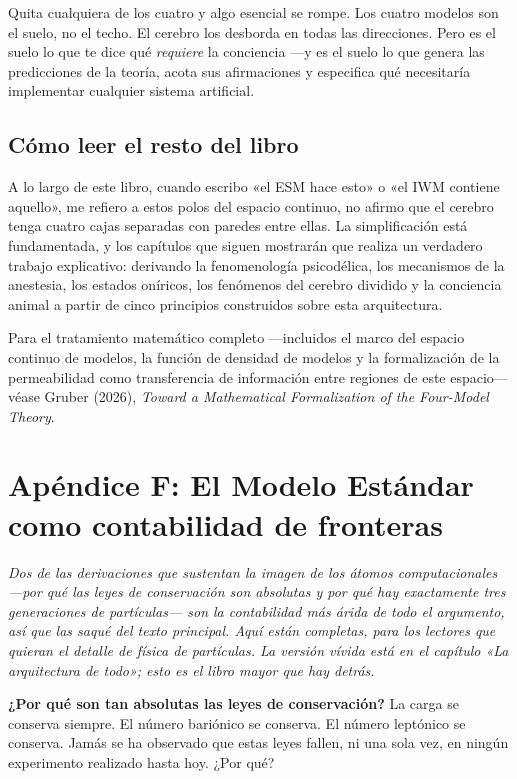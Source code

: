 \documentclass[11pt, twoside, openright]{book}
\begin{document}
Quita cualquiera de los cuatro y algo esencial se rompe. Los cuatro modelos son el suelo, no el techo. El cerebro los desborda en todas las direcciones. Pero es el suelo lo que te dice qué \textit{requiere} la conciencia ---y es el suelo lo que genera las predicciones de la teoría, acota sus afirmaciones y especifica qué necesitaría implementar cualquier sistema artificial.

\section*{Cómo leer el resto del libro}

A lo largo de este libro, cuando escribo «el ESM hace esto» o «el IWM contiene aquello», me refiero a estos polos del espacio continuo, no afirmo que el cerebro tenga cuatro cajas separadas con paredes entre ellas. La simplificación está fundamentada, y los capítulos que siguen mostrarán que realiza un verdadero trabajo explicativo: derivando la fenomenología psicodélica, los mecanismos de la anestesia, los estados oníricos, los fenómenos del cerebro dividido y la conciencia animal a partir de cinco principios construidos sobre esta arquitectura.

Para el tratamiento matemático completo ---incluidos el marco del espacio continuo de modelos, la función de densidad de modelos y la formalización de la permeabilidad como transferencia de información entre regiones de este espacio--- véase Gruber (2026), \textit{Toward a Mathematical Formalization of the Four-Model Theory}.


\chapter*{Apéndice F: El Modelo Estándar como contabilidad de fronteras}

\textit{Dos de las derivaciones que sustentan la imagen de los átomos computacionales ---por qué las leyes de conservación son absolutas y por qué hay exactamente tres generaciones de partículas--- son la contabilidad más árida de todo el argumento, así que las saqué del texto principal. Aquí están completas, para los lectores que quieran el detalle de física de partículas. La versión vívida está en el capítulo «La arquitectura de todo»; esto es el libro mayor que hay detrás.}

\textbf{¿Por qué son tan absolutas las leyes de conservación?} La carga se conserva siempre. El número bariónico se conserva. El número leptónico se conserva. Jamás se ha observado que estas leyes fallen, ni una sola vez, en ningún experimento realizado hasta hoy. ¿Por qué?
\end{document}

